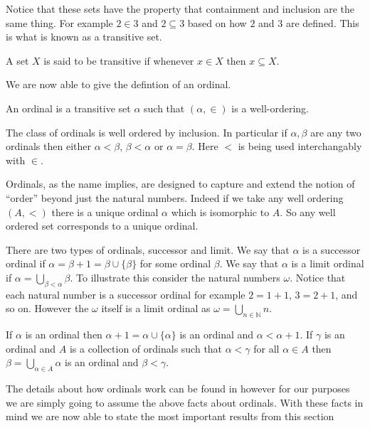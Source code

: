 Notice that these sets have the property that containment and inclusion are the
same thing. For example $2 \in 3$ and $2 \subseteq 3$ based on how $2$ and $3$ 
are defined.  This is what is known as a transitive set.

\begin{defn}[Transitive]
  A set $X$ is said to be transitive if whenever $x \in X$ then $x \subseteq
  X$.
\end{defn}

We are now able to give the defintion of an ordinal.

\begin{defn}[Ordinal]
  An ordinal is a transitive set $\alpha$ such that $(\alpha, \in)$ is
  a well-ordering.
\end{defn}


\begin{lemma}
  The class of ordinals is well ordered by inclusion. In particular if
  $\alpha, \beta$ are any two ordinals then either $\alpha < \beta$, $\beta
  < \alpha$ or $\alpha = \beta$. Here $<$ is being used interchangably with
  $\in$.
\end{lemma}

Ordinals, as the name implies, are designed to capture and extend the notion of
``order'' beyond just the natural numbers. Indeed if we take any well ordering
$(A, <)$ there is a unique ordinal $\alpha$ which is isomorphic to $A$. So any
well ordered set corresponds to a unique ordinal.

There are two types of ordinals, successor and limit. We say that $\alpha$ is
a successor ordinal if $\alpha = \beta + 1 = \beta \cup \{\beta\}$ 
for some ordinal $\beta$. We say that $\alpha$ is a limit ordinal 
if $\alpha = \bigcup_{\beta < \alpha} \beta$. To illustrate this consider the 
natural numbers $\omega$. Notice that each natural number is a successor 
ordinal for example $2 = 1 + 1$, $3 = 2 + 1$, and so on. However the $\omega$
itself is a limit ordinal as $\omega = \bigcup_{n \in \mathbb{N}} n$.

\begin{lemma}
  If $\alpha$ is an ordinal then $\alpha + 1 = \alpha \cup \{\alpha\}$ is an
  ordinal and $\alpha < \alpha + 1$. If $\gamma$ is an ordinal and $A$ is
  a collection of ordinals such that $\alpha < \gamma$ for all $\alpha \in A$ 
  then $\beta = \bigcup_{\alpha \in A} \alpha$ is an ordinal and $\beta
  < \gamma$.
\end{lemma}

The details about how ordinals work can be found in \cite{Schimmerling2011-li}
however for our purposes we are simply going to assume the above
facts about ordinals. With these facts in mind we are now able to state the most 
important results from this section

